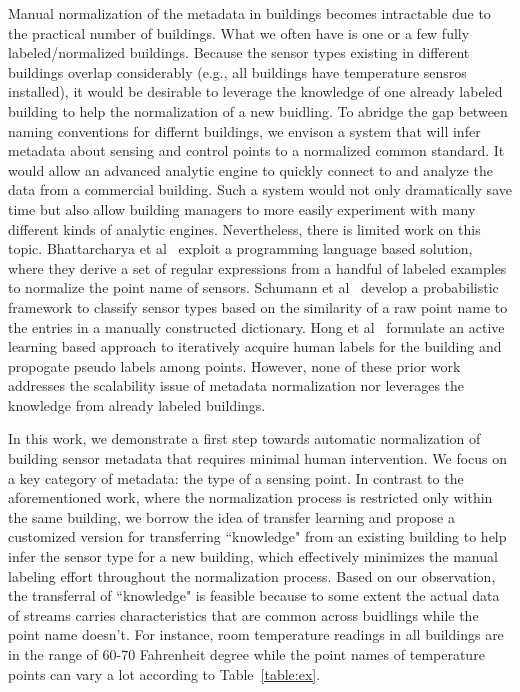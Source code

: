 Manual normalization of the metadata in buildings becomes intractable due to 
the practical number of buildings. What we often have is one or a few fully 
labeled/normalized buildings. Because the sensor types existing in different buildings 
overlap considerably (e.g., all buildings have temperature sensros installed), it 
would be desirable to leverage the knowledge of one already labeled building to 
help the normalization of a new buidling. 
To abridge the gap between naming conventions for differnt buildings, we envison 
a system that will infer metadata about sensing and control points to a normalized 
common standard.
It would allow an advanced analytic engine to quickly connect to and analyze the data 
from a commercial building. Such a system would not only dramatically save time 
but also allow building managers to more easily experiment with many different kinds 
of analytic engines. 
Nevertheless, there is limited work on this topic. 
Bhattarcharya et al~\cite{arka} exploit a programming language based solution, 
where they derive a set of regular expressions from a handful of labeled examples 
to normalize the point name of sensors. 
Schumann et al~\cite{ibm} develop a probabilistic framework to classify sensor types 
based on the similarity of a raw point name to the entries in a manually constructed dictionary. 
Hong et al~\cite{cikm} formulate an active learning based approach to iteratively 
acquire human labels for the building and propogate pseudo labels among points.
However, none of these prior work addresses the scalability issue of metadata 
normalization nor leverages the knowledge from already labeled buildings.

In this work, we demonstrate a first step towards automatic normalization of building 
sensor metadata that requires minimal human intervention. We focus on a key category 
of metadata: the type of a sensing point. In contrast to the aforementioned work, 
where the normalization process is restricted only within the same building, 
we borrow the idea of transfer learning and propose a customized version for transferring 
``knowledge" from an existing building to help infer the sensor type for a new building, which 
effectively minimizes the manual labeling effort throughout the normalization process. 
Based on our observation, the transferral of ``knowledge" is feasible because 
to some extent the actual data of streams carries characteristics that are common 
across buidlings while the point name doesn't. For instance, room temperature 
readings in all buildings are in the range of 60-70 Fahrenheit degree while 
the point names of temperature points can vary a lot according to 
Table~\ref{table:ex}.

